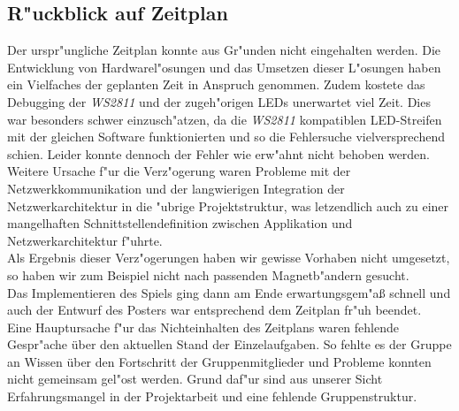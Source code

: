 \documentclass[a4paper]{article}
\begin{document}
  \subsection{R"uckblick auf Zeitplan}
  Der urspr"ungliche Zeitplan konnte aus Gr"unden nicht eingehalten werden.
  Die Entwicklung von Hardwarel"osungen und das Umsetzen dieser L"osungen haben
  ein Vielfaches der geplanten Zeit in Anspruch genommen. Zudem kostete das
  Debugging der \textit{WS2811} und der zugeh"origen LEDs unerwartet viel Zeit.
  Dies war besonders schwer einzusch"atzen, da die \textit{WS2811} kompatiblen
  LED-Streifen mit der gleichen Software funktionierten und so die Fehlersuche
  vielversprechend schien. Leider konnte dennoch der Fehler wie erw"ahnt nicht
  behoben werden. Weitere Ursache f"ur die Verz"ogerung waren Probleme mit der
  Netzwerkkommunikation und der langwierigen Integration der
  Netzwerkarchitektur in die "ubrige Projektstruktur, was letzendlich auch zu
  einer mangelhaften Schnittstellendefinition zwischen Applikation und
  Netzwerkarchitektur f"uhrte.\\ Als Ergebnis dieser Verz"ogerungen haben wir
  gewisse Vorhaben nicht umgesetzt, so haben wir zum Beispiel nicht nach
  passenden Magnetb"andern gesucht.\\ Das Implementieren des Spiels ging dann
  am Ende erwartungsgem"aß schnell und auch der Entwurf des Posters war
  entsprechend dem Zeitplan fr"uh beendet.\\ Eine Hauptursache f"ur das
  Nichteinhalten des Zeitplans waren fehlende Gespr"ache über den aktuellen
  Stand der Einzelaufgaben. So fehlte es der Gruppe an Wissen über den
  Fortschritt der Gruppenmitglieder und Probleme konnten nicht gemeinsam
  gel"ost werden.  Grund daf"ur sind aus unserer Sicht Erfahrungsmangel in
  der Projektarbeit und eine fehlende Gruppenstruktur.
\end{document}
